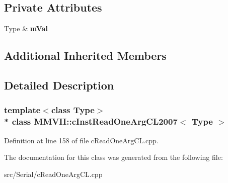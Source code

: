 \subsection*{Private Attributes}
\begin{DoxyCompactItemize}
\item 
Type \& {\bfseries m\+Val}\hypertarget{classMMVII_1_1cInstReadOneArgCL2007_a246992350293a56de17c87cafd788000}{}\label{classMMVII_1_1cInstReadOneArgCL2007_a246992350293a56de17c87cafd788000}

\end{DoxyCompactItemize}
\subsection*{Additional Inherited Members}


\subsection{Detailed Description}
\subsubsection*{template$<$class Type$>$\\*
class M\+M\+V\+I\+I\+::c\+Inst\+Read\+One\+Arg\+C\+L2007$<$ Type $>$}



Definition at line 158 of file c\+Read\+One\+Arg\+C\+L.\+cpp.



The documentation for this class was generated from the following file\+:\begin{DoxyCompactItemize}
\item 
src/\+Serial/c\+Read\+One\+Arg\+C\+L.\+cpp\end{DoxyCompactItemize}
